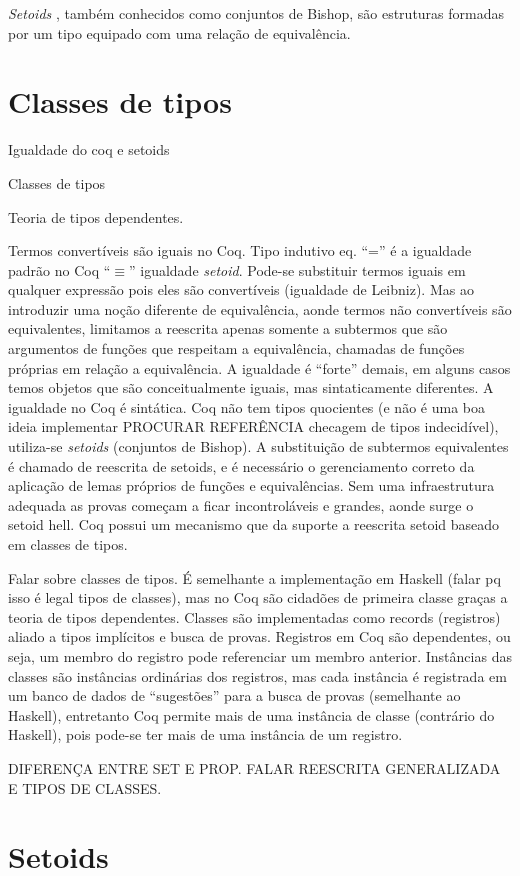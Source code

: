 \textit{Setoids} \cite{Barthe2003,Bishop2012}, também conhecidos como conjuntos de Bishop, são estruturas formadas por um tipo equipado com uma relação de equivalência.

\section{Classes de tipos}

Igualdade do coq e setoids

Classes de tipos


Teoria de tipos dependentes.

Termos convertíveis são iguais no Coq. Tipo indutivo eq. ``='' é a igualdade padrão no Coq ``$\equiv$'' igualdade \textit{setoid}. Pode-se substituir termos iguais em qualquer expressão pois eles são convertíveis (igualdade de Leibniz).
Mas ao introduzir uma noção diferente de equivalência, aonde termos não convertíveis são equivalentes, limitamos a reescrita
apenas somente a subtermos que são argumentos de funções que respeitam a equivalência, chamadas de funções próprias em relação a equivalência. A igualdade é ``forte'' demais, em alguns casos temos objetos que são conceitualmente iguais, mas sintaticamente diferentes. A igualdade no Coq é sintática. Coq não tem tipos quocientes (e não é uma boa ideia implementar PROCURAR REFERÊNCIA checagem de tipos indecidível), utiliza-se \textit{setoids} (conjuntos de Bishop). A substituição de subtermos equivalentes é chamado de reescrita de setoids, e é necessário o gerenciamento correto da aplicação de lemas próprios de funções e equivalências. Sem uma infraestrutura adequada as provas começam a ficar incontroláveis e grandes, aonde surge o setoid hell. Coq possui um mecanismo que da suporte a reescrita setoid baseado em classes de tipos.


Falar sobre classes de tipos. É semelhante a implementação em Haskell (falar pq isso é legal tipos de classes), mas no Coq são cidadões de primeira classe graças a teoria de tipos dependentes. Classes são implementadas como records (registros) aliado a tipos implícitos e busca de provas. Registros em Coq são dependentes, ou seja, um membro do registro pode referenciar um membro anterior. Instâncias das classes são instâncias ordinárias dos registros, mas cada instância é registrada em um banco de dados de ``sugestões'' para a busca de provas (semelhante ao Haskell), entretanto Coq permite mais de uma instância de classe (contrário do Haskell), pois pode-se ter mais de uma instância de um registro.

DIFERENÇA ENTRE SET E PROP. FALAR REESCRITA GENERALIZADA E TIPOS DE CLASSES.
\section{Setoids}